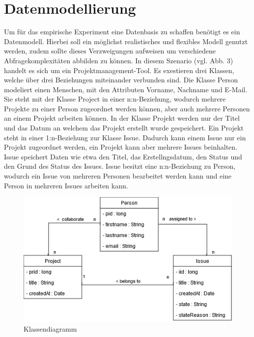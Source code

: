 \chapter{Datenmodellierung} %
\label{sec:datamodelling}
Um für das empirische Experiment eine Datenbasis zu schaffen benötigt es ein Datenmodell. Hierbei soll ein möglichst realistisches und flexibles Modell genutzt werden, zudem sollte dieses Verzweigungen aufweisen um verschiedene Abfragekomplexitäten abbilden zu können. In diesem Szenario (vgl. Abb. 3) handelt es sich um ein Projektmanagement-Tool. Es exestieren drei Klassen, welche über drei Beziehungen miteinander verbunden sind. Die Klasse Person modeliert einen Menschen, mit den Attributen Vorname, Nachname und E-Mail. Sie steht mit der Klasse Project in einer n:n-Beziehung, wodurch mehrere Projekte zu einer Person zugeordnet werden können, aber auch mehrere Personen an einem Projekt arbeiten können. In der Klasse Projekt werden nur der Titel und das Datum an welchem das Projekt erstellt wurde gespeichert. Ein Projekt steht in einer 1:n-Beziehung zur Klasse Issue. Dadurch kann einem Issue nur ein Projekt zugeordnet werden, ein Projekt kann aber mehrere Issues beinhalten. Issue speichert Daten wie etwa den Titel, das Erstellngsdatum, den Status und den Grund des Status des Issues. Issue besitzt eine n:n-Beziehung zu Person, wodurch ein Issue von mehreren Personen bearbeitet werden kann und eine Person in mehreren Issues arbeiten kann.
\vspace{1cm}
\label{sec:datenmodell}
\begin{figure}[h!]
	\centering
	\includegraphics[scale=.8]{Illustrations/class_diagram.png}
	\caption{Klassendiagramm}
\end{figure}



